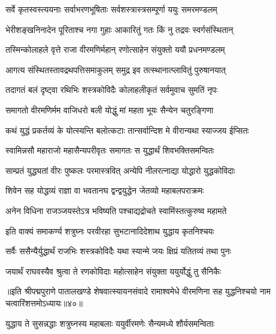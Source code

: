 \twolineshloka
{सर्वे कृतस्वस्त्ययनाः सर्वाभरणभूषिताः}
{सर्वशस्त्रास्त्रसम्पूर्णा ययुः समरमण्डलम्}%

\twolineshloka
{भेरीशङ्खनिनादेन पूरिताश्च नगा गुहाः}
{आकारितुं गतः किं नु तद्रवः स्वर्गसंस्थितान्}%

\twolineshloka
{तस्मिन्कोलाहले वृत्ते राजा वीरमणिर्महान्}
{रणोत्साहेन संयुक्तो ययौ प्रधनमण्डलम्}%

\twolineshloka
{आगत्य संस्थितस्तावद्रथपत्तिसमाकुलम्}
{समुद्र इव तत्स्थानात्प्लावितुं पुरुषानयात्}%

\twolineshloka
{तदागतं बलं दृष्ट्वा रथिभिः शस्त्रकोविदैः}
{कोलाहलीकृतं सर्वमुवाच सुमतिं नृपः}%


\twolineshloka
{समागतो वीरमणिर्मम वाजिधरो बली}
{योद्धुं मां महता भूयः सैन्येन चतुरङ्गिणा}%

\twolineshloka
{कथं युद्धं प्रकर्तव्यं के योत्स्यन्ति बलोत्कटाः}
{तान्सर्वान्दिश मे वीरान्यथा स्याज्जय ईप्सितः}%


\twolineshloka
{स्वामिन्नसौ महाराजो महासैन्यपरीवृतः}
{समागतः स युद्धार्थं शिवभक्तिसमन्वितः}%

\twolineshloka
{साम्प्रतं युद्ध्यतां वीरः पुष्कलः परमास्त्रवित्}
{अन्येपि नीलरत्नाद्या योद्धारो युद्धकोविदाः}%

\twolineshloka
{शिवेन सह योद्धव्यं राज्ञा वा भवतानघ}
{द्वन्द्वयुद्धेन जेतव्यो महाबलपराक्रमः}%

\twolineshloka
{अनेन विधिना राजञ्जयस्तेऽत्र भविष्यति}
{पश्चाद्यद्रोचते स्वामिंस्तत्कुरुष्व महामते}%


\twolineshloka
{इति वाक्यं समाकर्ण्य शत्रुघ्नः परवीरहा}
{सुभटानादिदेशाथ युद्धाय कृतनिश्चयः}%

\twolineshloka
{सर्वैः ससैन्यैर्युद्धार्थं राजभिः शस्त्रकोविदैः}
{यथा स्यान्मे जयः क्षिप्रं यतितव्यं तथा पुनः}%

\twolineshloka
{जयार्थं राघवस्यैव श्रुत्वा ते रणकोविदाः}
{महोत्साहेन संयुक्ता ययुर्योद्धुं तु सैनिकैः}%

{॥इति श्रीपद्मपुराणे पातालखण्डे शेषवात्स्यायनसंवादे रामाश्वमेधे वीरमणिना सह युद्धनिश्चयो नाम चत्वारिंशत्तमोऽध्यायः॥४०॥}



\twolineshloka
{युद्धाय ते सुसन्नद्धाः शत्रुघ्नस्य महाबलाः}
{ययुर्वीरमणेः सैन्यमध्ये शौर्यसमन्विताः}%

